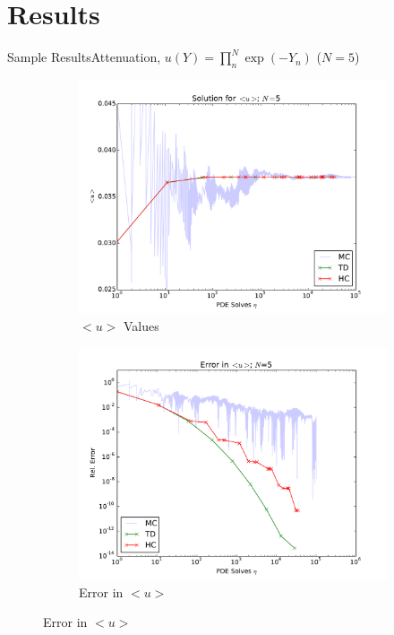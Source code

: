 \documentclass{beamer}
\begin{document}
\section{Results}
\begin{frame}{Sample Results}{Attenuation,  $u(Y)=\prod_n^N \exp(-Y_n)$ ($N=5$)}
  \begin{figure}[h!]
    \centering
    \begin{subfigure}[b]{0.49 \textwidth}
      \includegraphics[width=\textwidth]{../graphics/attenuate_N5_soln}
      \caption{$<u>$ Values}
      \label{err_5}
    \end{subfigure}
    \begin{subfigure}[b]{0.49 \textwidth}
      \includegraphics[width=\textwidth]{../graphics/attenuate_N5_conv}
      \caption{Error in $<u>$}
      \label{err_14}
    \end{subfigure}
  \end{figure}
\end{frame}
\end{document}

